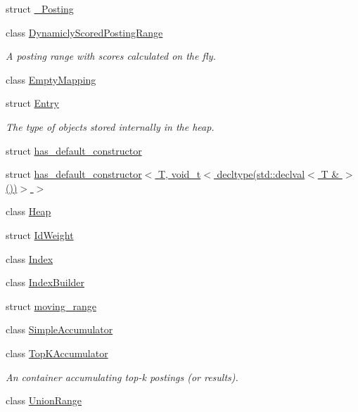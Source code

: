 \begin{DoxyCompactItemize}
\item 
struct \hyperlink{structirkit_1_1__Posting}{\+\_\+\+Posting}
\item 
class \hyperlink{classirkit_1_1DynamiclyScoredPostingRange}{Dynamicly\+Scored\+Posting\+Range}
\begin{DoxyCompactList}\small\item\em A posting range with scores calculated on the fly. \end{DoxyCompactList}\item 
class \hyperlink{classirkit_1_1EmptyMapping}{Empty\+Mapping}
\item 
struct \hyperlink{structirkit_1_1Entry}{Entry}
\begin{DoxyCompactList}\small\item\em The type of objects stored internally in the heap. \end{DoxyCompactList}\item 
struct \hyperlink{structirkit_1_1has__default__constructor}{has\+\_\+default\+\_\+constructor}
\item 
struct \hyperlink{structirkit_1_1has__default__constructor_3_01T_00_01void__t_3_01decltype_07std_1_1declval_3_01T_01_6_01_4_07_08_08_4_01_4}{has\+\_\+default\+\_\+constructor$<$ T, void\+\_\+t$<$ decltype(std\+::declval$<$ T \& $>$())$>$ $>$}
\item 
class \hyperlink{classirkit_1_1Heap}{Heap}
\item 
struct \hyperlink{structirkit_1_1IdWeight}{Id\+Weight}
\item 
class \hyperlink{classirkit_1_1Index}{Index}
\item 
class \hyperlink{classirkit_1_1IndexBuilder}{Index\+Builder}
\item 
struct \hyperlink{structirkit_1_1moving__range}{moving\+\_\+range}
\item 
class \hyperlink{classirkit_1_1SimpleAccumulator}{Simple\+Accumulator}
\item 
class \hyperlink{classirkit_1_1TopKAccumulator}{Top\+K\+Accumulator}
\begin{DoxyCompactList}\small\item\em An container accumulating top-\/k postings (or results). \end{DoxyCompactList}\item 
class \hyperlink{classirkit_1_1UnionRange}{Union\+Range}
\end{DoxyCompactItemize}
